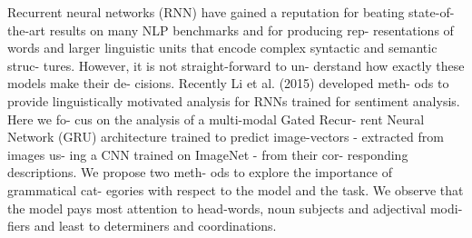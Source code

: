 Recurrent neural networks (RNN) have gained a reputation for beating state-of-the-art results on many NLP benchmarks and for producing rep- resentations of words and larger linguistic units that encode complex syntactic and semantic struc- tures. However, it is not straight-forward to un- derstand how exactly these models make their de- cisions. Recently Li et al. (2015) developed meth- ods to provide linguistically motivated analysis for RNNs trained for sentiment analysis. Here we fo- cus on the analysis of a multi-modal Gated Recur- rent Neural Network (GRU) architecture trained to predict image-vectors - extracted from images us- ing a CNN trained on ImageNet - from their cor- responding descriptions. We propose two meth- ods to explore the importance of grammatical cat- egories with respect to the model and the task. We observe that the model pays most attention to head-words, noun subjects and adjectival modi- fiers and least to determiners and coordinations.
